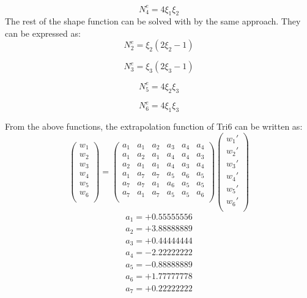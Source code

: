 \begin{equation}
N_4^e = 4\xi_1\xi_2
\end{equation}
The rest of the shape function can be solved with by the same approach. They can be expressed as:
\begin{equation}
N_2^e = \xi_2\left(2\xi_2-1\right)
\end{equation}

\begin{equation}
N_3^e = \xi_3\left(2\xi_3-1\right)
\end{equation}

\begin{equation}
N_5^e = 4\xi_2 \xi_3
\end{equation}

\begin{equation}
N_6^e = 4\xi_1 \xi_3
\end{equation}

From the above functions, the extrapolation function of Tri6 can be written as:
\begin{equation}
\begin{pmatrix}
w_1 \\
w_2 \\
w_3 \\
w_4 \\
w_5 \\
w_6 \\
\end{pmatrix} = \begin{pmatrix}
a_1 & a_1 &  a_2 &  a_3 & a_4 & a_4     \\[0.3em]
a_1 & a_2 &  a_1 &  a_4 & a_4 & a_3     \\[0.3em]
a_2 & a_1 &  a_1 &  a_4 & a_3 & a_4     \\[0.3em]
a_1 & a_7 &  a_7 &  a_5 & a_6 & a_5     \\[0.3em]
a_7 & a_7 &  a_1 &  a_6 & a_5 & a_5     \\[0.3em]
a_7 & a_1 &  a_7 &  a_5 & a_5 & a_6     \\[0.3em]            
\end{pmatrix} \begin{pmatrix}
{w_1}' \\
{w_2}' \\
{w_3}' \\
{w_4}' \\
{w_5}' \\
{w_6}' \\
\end{pmatrix}
\end{equation}	
\begin{align*}
a_1 = +0.55555556 \\
a_2 = +3.88888889 \\
a_3 = +0.44444444 \\
a_4 = -2.22222222 \\
a_5 = -0.88888889 \\
a_6 = +1.77777778 \\
a_7 = +0.22222222 \\
\end{align*}




